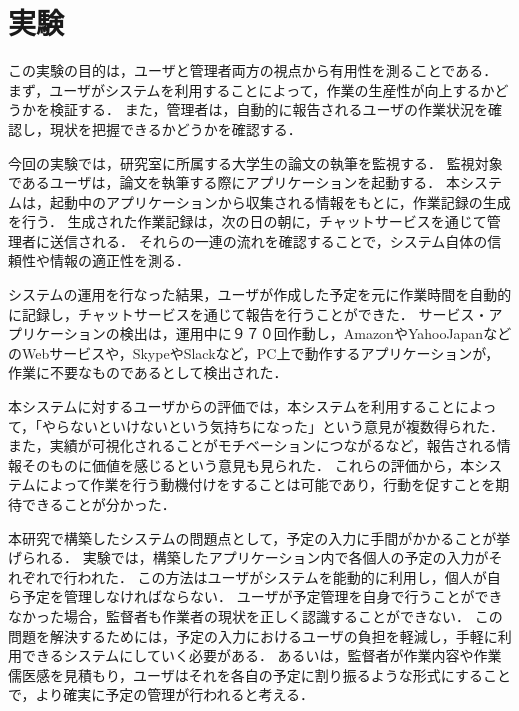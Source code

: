 \section{実験}

この実験の目的は，ユーザと管理者両方の視点から有用性を測ることである．
まず，ユーザがシステムを利用することによって，作業の生産性が向上するかどうかを検証する．
また，管理者は，自動的に報告されるユーザの作業状況を確認し，現状を把握できるかどうかを確認する．

今回の実験では，研究室に所属する大学生の論文の執筆を監視する．
監視対象であるユーザは，論文を執筆する際にアプリケーションを起動する．
本システムは，起動中のアプリケーションから収集される情報をもとに，作業記録の生成を行う．
生成された作業記録は，次の日の朝に，チャットサービスを通じて管理者に送信される．
それらの一連の流れを確認することで，システム自体の信頼性や情報の適正性を測る．

システムの運用を行なった結果，ユーザが作成した予定を元に作業時間を自動的に記録し，チャットサービスを通じて報告を行うことができた．
サービス・アプリケーションの検出は，運用中に９７０回作動し，AmazonやYahooJapanなどのWebサービスや，SkypeやSlackなど，PC上で動作するアプリケーションが，作業に不要なものであるとして検出された．

本システムに対するユーザからの評価では，本システムを利用することによって，「やらないといけないという気持ちになった」という意見が複数得られた．
また，実績が可視化されることがモチベーションにつながるなど，報告される情報そのものに価値を感じるという意見も見られた．
これらの評価から，本システムによって作業を行う動機付けをすることは可能であり，行動を促すことを期待できることが分かった．

本研究で構築したシステムの問題点として，予定の入力に手間がかかることが挙げられる．
実験では，構築したアプリケーション内で各個人の予定の入力がそれぞれで行われた．
この方法はユーザがシステムを能動的に利用し，個人が自ら予定を管理しなければならない．
ユーザが予定管理を自身で行うことができなかった場合，監督者も作業者の現状を正しく認識することができない．
この問題を解決するためには，予定の入力におけるユーザの負担を軽減し，手軽に利用できるシステムにしていく必要がある．
あるいは，監督者が作業内容や作業儒医感を見積もり，ユーザはそれを各自の予定に割り振るような形式にすることで，より確実に予定の管理が行われると考える．

